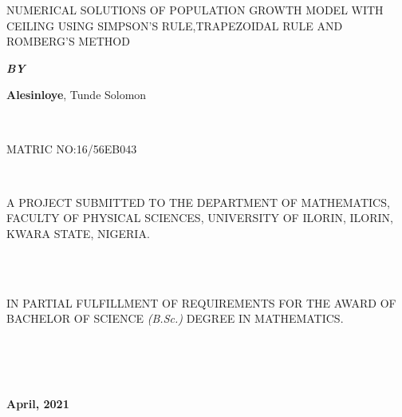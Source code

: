 \documentclass[a4paper,12pt]{report}
\numberwithin{equation}{section}
\begin{document}
	
	\begin{center}
		\LARGE NUMERICAL SOLUTIONS OF POPULATION GROWTH MODEL WITH CEILING USING SIMPSON'S RULE,TRAPEZOIDAL RULE AND ROMBERG'S METHOD
	\end{center}
	
	\hspace{5cm}
	
	\begin{center}
		\textbf{\textit{BY}}
	\end{center}
	
	\hspace{5cm}
	
	\begin{center}
		\Large \textbf{Alesinloye}, Tunde Solomon
	\end{center}

	\hspace{5cm} \\
	
	\begin{center}
		MATRIC NO:16/56EB043
	\end{center}

	\hspace{9cm} \\
	
	\begin{center}
		A PROJECT SUBMITTED TO THE DEPARTMENT OF MATHEMATICS, FACULTY OF PHYSICAL SCIENCES, UNIVERSITY OF ILORIN, ILORIN, KWARA STATE, NIGERIA.
	\end{center}
	
	\hspace{8cm} \\ \\
	
	\begin{center}
		IN PARTIAL FULFILLMENT OF REQUIREMENTS FOR THE AWARD OF BACHELOR OF SCIENCE \textit{(B.Sc.)} DEGREE IN MATHEMATICS.
	\end{center}
	\hspace{5cm}
	\\ \\ \\
	\begin{center}
		\textbf{April, 2021}
	\end{center}
	
	\newpage
	
	\tableofcontents
	
\end{document}
